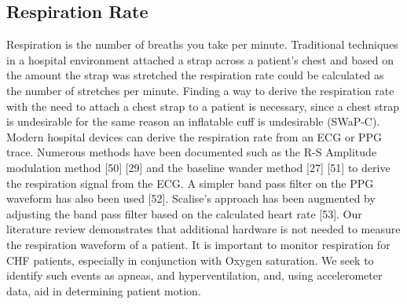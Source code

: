 \subsection{Respiration Rate}
Respiration is the number of breaths you take per minute. Traditional techniques in a hospital environment attached a strap across a patient’s chest and based on the amount the strap was stretched the respiration rate could be calculated as the number of stretches per minute. Finding a way to derive the respiration rate with the need to attach a chest strap to a patient is necessary, since a chest strap is undesirable for the same reason an inflatable cuff is undesirable (SWaP-C). Modern hospital devices can derive the respiration rate from an ECG or PPG trace. Numerous methods have been documented such as the R-S Amplitude modulation method [50] [29] and the baseline wander method [27] [51] to derive the respiration signal from the ECG. A simpler band pass filter on the PPG waveform has also been used [52]. Scalise’s approach has been augmented by adjusting the band pass filter based on the calculated heart rate [53].
Our literature review demonstrates that additional hardware is not needed to measure the respiration waveform of a patient. It is important to monitor respiration for CHF patients, especially in conjunction with Oxygen saturation. We seek to identify such events as apneas, and hyperventilation, and, using accelerometer data, aid in determining patient motion.